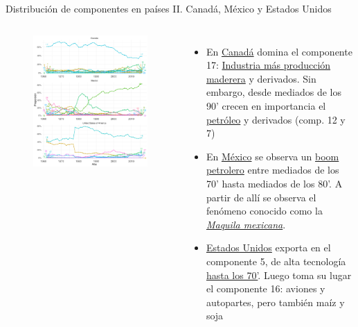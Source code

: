 \documentclass[compress]{beamer}
\begin{document}
\begin{frame}
\small
Distribución de componentes en países II. Canadá, México y Estados Unidos
\scriptsize
\begin{columns}[c] 

\begin{figure}
\includegraphics[width=\linewidth]{graficoLDA_k30_CAN_MEX_USA}
\end{figure}


\begin{itemize}[label=\faRebel]
\item En \underline{Canadá} domina el componente 17: \underline{Industria más producción maderera} y derivados. Sin embargo, desde mediados de los 90' crecen en importancia el \underline{petróleo} y derivados (comp. 12 y 7)
\item En \underline{México} se observa un \underline{boom petrolero} entre mediados de los 70' hasta mediados de los 80'. A partir de allí se observa el fenómeno conocido como la \underline{\textit{Maquila mexicana}}.
\item \underline{Estados Unidos} exporta en el componente 5, de alta tecnología\underline{ hasta los 70'}. Luego toma su lugar el componente 16: aviones y autopartes, pero también maíz y soja
\end{itemize}

\end{columns} 

\end{frame}
\end{document}
